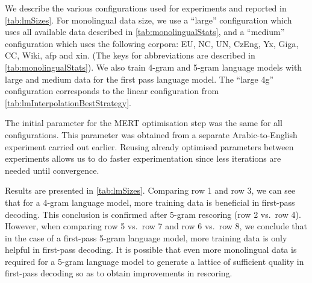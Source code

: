 We describe the various configurations used for experiments and
reported in \autoref{tab:lmSizes}. For monolingual data size,
we use a ``large'' configuration which uses all available
data described in \autoref{tab:monolingualStats}, and a
``medium'' configuration which uses the following corpora: EU, NC, UN, CzEng, Yx, Giga, CC, Wiki, afp and xin.
(The keys for abbreviations are described in \autoref{tab:monolingualStats}).
We also train 4-gram and 5-gram language models with large and
medium data for the first pass language model.
The ``large 4g'' configuration corresponds to the linear
configuration from \autoref{tab:lmInterpolationBestStrategy}.

The initial parameter for the MERT optimisation
step was the same for all configurations. This parameter was obtained
from a separate Arabic-to-English experiment carried out earlier. Reusing
already optimised parameters between experiments allows us to do faster
experimentation since less iterations are needed until convergence.

Results are presented in \autoref{tab:lmSizes}.
Comparing row 1 and row 3, we can see that for a 4-gram
language model, more training data is beneficial in first-pass decoding.
This conclusion is confirmed after 5-gram rescoring (row 2 vs.\ row 4).
However, when comparing row 5 vs.\ row 7 and row 6 vs.\ row 8, we conclude that
in the case of a first-pass 5-gram language model, more training
data is only helpful in first-pass decoding.
It is possible that even more monolingual data is required for a 5-gram
language model to generate a lattice of sufficient quality in first-pass
decoding so as to obtain improvements in rescoring.

